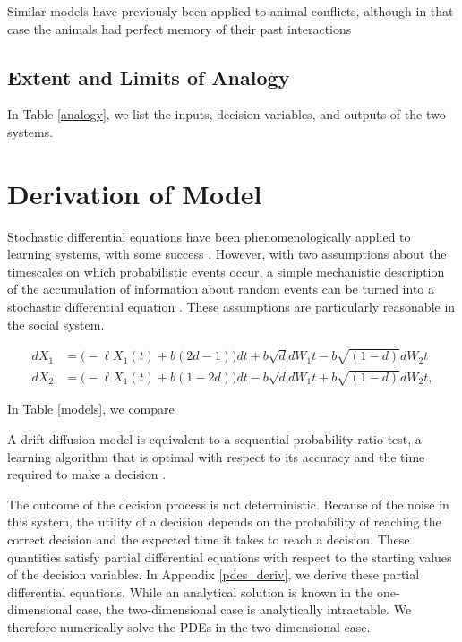 \documentclass{article}
\begin{document}
Similar models have previously been applied to animal conflicts, although in that case the animals had perfect memory of their past interactions \citep{Froment:2010fk}

\subsection{Extent and Limits of Analogy }

In Table \ref{analogy}, we list the inputs, decision variables, and outputs of the two systems.  

\section{Derivation of Model \label{derivation}}
Stochastic differential equations have been phenomenologically applied to learning systems, with some success \citep{Eckhoff:2008uq, Brown:2005fk,Feng:2009kl,Bogacz:2006uq}.  However, with two assumptions about the timescales on which probabilistic events occur, a simple mechanistic description of the accumulation of information about random events can be turned into a stochastic differential equation \cite{Gillespie:2000fk}.  These assumptions are particularly reasonable in the social system.

\begin{equation}
\begin{array}{ll}
dX_1&=\bigg(-\ell X_1(t)+b(2d-1)\bigg)dt+b\sqrt{d}dW_{1}t-b\sqrt{(1-d)}dW_{2}t
\\dX_2&=\bigg(-\ell X_1(t)+b(1-2d)\bigg)dt-b\sqrt{d}dW_{1}t+b\sqrt{(1-d)}dW_{2}t,
\end{array}
\end{equation}

In Table \ref{models}, we compare 

A drift diffusion model is equivalent to a sequential probability ratio test, a learning algorithm that is optimal with respect to its accuracy and the time required to make a decision \cite{Moehlis:2004fk,Bogacz:2006uq}.  

The outcome of the decision process is not deterministic. Because of the noise in this system, the utility of a decision depends on the probability of reaching the correct decision and the expected time it takes to reach a decision.  These quantities satisfy partial differential equations with respect to the starting values of the decision variables. In Appendix \ref{pdes_deriv}, we derive these partial differential equations.  While an analytical solution is known in the one-dimensional case, the two-dimensional case is analytically intractable.  We therefore numerically solve the PDEs in the two-dimensional case.
\end{document}

